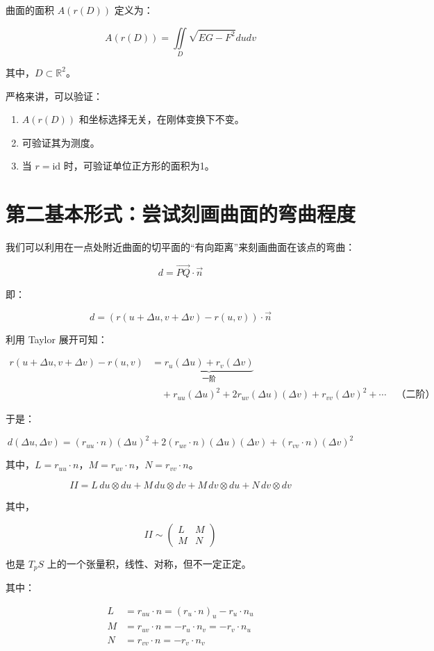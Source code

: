 \documentclass[lang=cn,10pt,thmcnt=section]{elegantbook}
\begin{document}
\begin{definition}[曲面面积]
    曲面的面积 $A(r(D))$ 定义为：

    $$
    A(r(D)) = \iint\limits_{D} \sqrt{EG - F^2} du dv
    $$

    其中，$D \subset \mathbb{R}^2$。
\end{definition}
\begin{remark}
    严格来讲，可以验证：
\begin{enumerate}
    \item $A(r(D))$ 和坐标选择无关，在刚体变换下不变。
    \item 可验证其为测度。
    \item  当 $r = \text{id}$ 时，可验证单位正方形的面积为1。
\end{enumerate}
\section{第二基本形式：尝试刻画曲面的弯曲程度}
我们可以利用在一点处附近曲面的切平面的“有向距离”来刻画曲面在该点的弯曲：

\[
d = \overrightarrow{PQ} \cdot \vec{n}
\]

即：

\[
d = \left( r(u + \Delta u, v + \Delta v) - r(u, v) \right) \cdot \vec{n}
\]

\end{remark}
利用 Taylor 展开可知：

$$
\begin{aligned}
r(u + \Delta u, v + \Delta v) - r(u, v) &= \underbrace{r_u (\Delta u) + r_v (\Delta v)}_{\text{一阶}} \\
&\quad + r_{uu} (\Delta u)^2 + 2 r_{uv} (\Delta u)(\Delta v) + r_{vv} (\Delta v)^2 + \cdots \quad \text{（二阶）}
\end{aligned}
$$

于是：

$$
d(\Delta u, \Delta v) = (r_{uu} \cdot n) (\Delta u)^2 + 2 (r_{uv} \cdot n) (\Delta u)(\Delta v) + (r_{vv} \cdot n) (\Delta v)^2
$$

其中，$L = r_{uu} \cdot n$，$M = r_{uv} \cdot n$，$N = r_{vv} \cdot n$。


\begin{definition}[ 第二基本形式]
    $$
II = L \, du \otimes du + M \, du \otimes dv + M \, dv \otimes du + N \, dv \otimes dv
$$

其中，

$$
II \sim \begin{pmatrix} L & M \\ M & N \end{pmatrix}
$$

也是 $T_p S$ 上的一个张量积，线性、对称，但不一定正定。

其中：

\begin{align*}
L &= r_{uu} \cdot n = (r_u \cdot n)_u - r_u \cdot n_u \\
M &= r_{uv} \cdot n = -r_u \cdot n_v = -r_v \cdot n_u \\
N &= r_{vv} \cdot n = -r_v \cdot n_v
\end{align*}
\end{definition}
\end{document}
